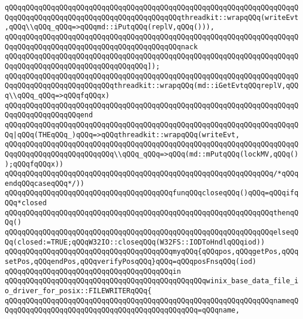 \verb|qQQqqQQqqQQqqQQqqQQqqQQqqQQqqQQqqQQqqQQqqQQqqQQqqQQqqQQqqQQqqQQqqQQqqQQqqQQqqQQqqQQqqQQqqQQqqQQqqQQqqQQqqQQqqQQqthreadkit::wrapqQQq(writeEvt,qQQq\\qQQq_qQQq=>qQQqmd::iPutqQQq(replV,qQQq())),|\newline
\verb|qQQqqQQqqQQqqQQqqQQqqQQqqQQqqQQqqQQqqQQqqQQqqQQqqQQqqQQqqQQqqQQqqQQqqQQqqQQqqQQqqQQqqQQqqQQqqQQqqQQqqQQqqQQqqQQqnack|\newline
\verb|qQQqqQQqqQQqqQQqqQQqqQQqqQQqqQQqqQQqqQQqqQQqqQQqqQQqqQQqqQQqqQQqqQQqqQQqqQQqqQQqqQQqqQQqqQQqqQQqqQQqqQQq]);|\newline
\verb|qQQqqQQqqQQqqQQqqQQqqQQqqQQqqQQqqQQqqQQqqQQqqQQqqQQqqQQqqQQqqQQqqQQqqQQqqQQqqQQqqQQqqQQqqQQqqQQqthreadkit::wrapqQQq(md::iGetEvtqQQqreplV,qQQq\\qQQq_qQQq=>qQQqfqQQqx)|\newline
\verb|qQQqqQQqqQQqqQQqqQQqqQQqqQQqqQQqqQQqqQQqqQQqqQQqqQQqqQQqqQQqqQQqqQQqqQQqqQQqqQQqqQQqqQQqend|\newline
\verb|qQQqqQQqqQQqqQQqqQQqqQQqqQQqqQQqqQQqqQQqqQQqqQQqqQQqqQQqqQQqqQQqqQQqqQQq|\verb#|qQQq(THEqQQq_)qQQq=>qQQqthreadkit::wrapqQQq(writeEvt,#\newline
\verb|qQQqqQQqqQQqqQQqqQQqqQQqqQQqqQQqqQQqqQQqqQQqqQQqqQQqqQQqqQQqqQQqqQQqqQQqqQQqqQQqqQQqqQQqqQQqqQQq\\qQQq_qQQq=>qQQq(md::mPutqQQq(lockMV,qQQq());qQQqfqQQqx))|\newline
\verb|qQQqqQQqqQQqqQQqqQQqqQQqqQQqqQQqqQQqqQQqqQQqqQQqqQQqqQQqqQQqqQQq/*qQQqendqQQqcaseqQQq*/))|\newline
\verb|qQQqqQQqqQQqqQQqqQQqqQQqqQQqqQQqqQQqqQQqfunqQQqcloseqQQq()qQQq=qQQqifqQQq*closed|\newline
\verb|qQQqqQQqqQQqqQQqqQQqqQQqqQQqqQQqqQQqqQQqqQQqqQQqqQQqqQQqqQQqqQQqthenqQQq()|\newline
\verb|qQQqqQQqqQQqqQQqqQQqqQQqqQQqqQQqqQQqqQQqqQQqqQQqqQQqqQQqqQQqqQQqelseqQQq(closed:=TRUE;qQQqW32IO::closeqQQq(W32FS::IODToHndlqQQqiod))|\newline
\verb|qQQqqQQqqQQqqQQqqQQqqQQqqQQqqQQqqQQqqQQqmyqQQq{qQQqpos,qQQqgetPos,qQQqsetPos,qQQqendPos,qQQqverifyPosqQQq}qQQq=qQQqposFnsqQQq(iod)|\newline
\verb|qQQqqQQqqQQqqQQqqQQqqQQqqQQqqQQqqQQqqQQqin|\newline
\verb|qQQqqQQqqQQqqQQqqQQqqQQqqQQqqQQqqQQqqQQqqQQqqQQqwinix_base_data_file_io_driver_for_posix::FILEWRITERqQQq{|\newline
\verb|qQQqqQQqqQQqqQQqqQQqqQQqqQQqqQQqqQQqqQQqqQQqqQQqqQQqqQQqqQQqqQQqnameqQQqqQQqqQQqqQQqqQQqqQQqqQQqqQQqqQQqqQQqqQQqqQQq=qQQqname,|\newline
